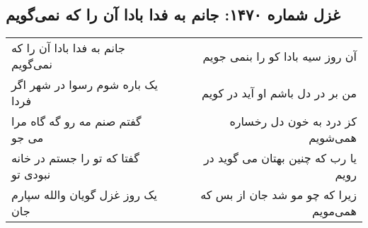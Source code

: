 \begin{center}
\section*{غزل شماره ۱۴۷۰: جانم به فدا بادا آن را که نمی‌گویم}
\label{sec:1470}
\begin{longtable}{l p{0.5cm} r}
جانم به فدا بادا آن را که نمی‌گویم
&&
آن روز سیه بادا کو را بنمی جویم
\\
یک باره شوم رسوا در شهر اگر فردا
&&
من بر در دل باشم او آید در کویم
\\
گفتم صنم مه رو گه گاه مرا می جو
&&
کز درد به خون دل رخساره همی‌شویم
\\
گفتا که تو را جستم در خانه نبودی تو
&&
یا رب که چنین بهتان می گوید در رویم
\\
یک روز غزل گویان والله سپارم جان
&&
زیرا که چو مو شد جان از بس که همی‌مویم
\\
\end{longtable}
\end{center}
